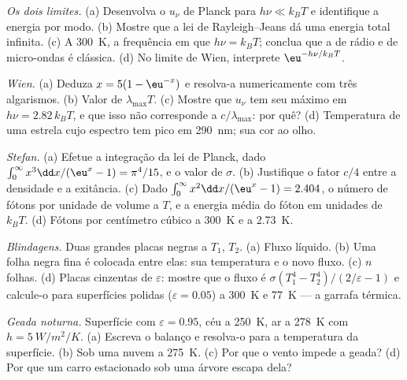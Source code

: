 \begin{exercise}[$\star\star$]\label{exo:b2:thermal-radiation:5}
\emph{Os dois limites.} (a) Desenvolva o $u_\nu$ de Planck para $h\nu \ll k_BT$ e
identifique a energia por modo. (b) Mostre que a lei de Rayleigh--Jeans
dá uma energia total infinita. (c) A \qty{300}{K}, a frequência em que
$h\nu = k_BT$; conclua que a  de rádio e de micro-ondas é
clássica. (d) No limite de Wien, interprete $\eu^{-h\nu/k_BT}$.
\end{exercise}

\begin{exercise}[$\star\star$]\label{exo:b2:thermal-radiation:6}
\emph{Wien.} (a) Deduza $x = 5(1 - \eu^{-x})$ e resolva-a numericamente
com três algarismos. (b) Valor de $\lambda_{\max}T$. (c) Mostre que $u_\nu$
tem seu máximo em $h\nu = 2.82\,k_BT$, e que isso não corresponde a
$c/\lambda_{\max}$: por quê? (d) Temperatura de uma estrela cujo espectro
tem pico em \qty{290}{nm}; sua cor ao olho.
\end{exercise}

\begin{exercise}[$\star\star$]\label{exo:b2:thermal-radiation:7}
\emph{Stefan.} (a) Efetue a integração da lei de Planck, dado
$\int_0^\infty x^3\dd x/(\eu^x - 1) = \pi^4/15$, e o valor de $\sigma$.
(b) Justifique o fator $c/4$ entre a densidade e a exitância. (c)
Dado $\int_0^\infty x^2\dd x/(\eu^x - 1) = 2.404$, o número de fótons
por unidade de volume a $T$, e a energia média do fóton em unidades de $k_BT$.
(d) Fótons por centímetro cúbico a \qty{300}{K} e a \qty{2.73}{K}.
\end{exercise}

\begin{exercise}[$\star\star$]\label{exo:b2:thermal-radiation:8}
\emph{Blindagens.} Duas grandes placas negras a $T_1$, $T_2$. (a) Fluxo líquido.
(b) Uma folha negra fina é colocada entre elas: sua temperatura e o
novo fluxo. (c) $n$ folhas. (d) Placas cinzentas de  $\varepsilon$:
mostre que o fluxo é $\sigma(T_1^4 - T_2^4)/(2/\varepsilon - 1)$ e calcule-o
para superfícies polidas ($\varepsilon = 0.05$) a \qty{300}{K} e
\qty{77}{K} --- a garrafa térmica.
\end{exercise}

\begin{exercise}[$\star\star$]\label{exo:b2:thermal-radiation:9}
\emph{Geada noturna.} Superfície com $\varepsilon = 0.95$, céu a \qty{250}{K}, ar a
\qty{278}{K} com $h = \qty{5}{W/m^2/K}$. (a) Escreva o balanço e resolva-o
para a temperatura da superfície. (b) Sob uma nuvem a \qty{275}{K}. (c) Por que
o vento impede a geada? (d) Por que um carro estacionado sob uma árvore escapa
dela?
\end{exercise}

